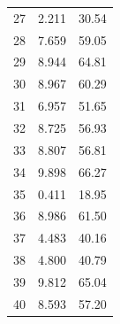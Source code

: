 \documentclass[10.5pt,notitlepage]{article}
\theoremstyle{plain}
\begin{document}
\begin{table}[htbp]
\begin{tabular}{@{}lr@{\hskip 0.4in}r@{}}
            27 & 2.211 & 30.54 \\
            28 & 7.659 & 59.05 \\
            29 & 8.944 & 64.81 \\
            30 & 8.967 & 60.29 \\
            31 & 6.957 & 51.65 \\
            32 & 8.725 & 56.93 \\
            33 & 8.807 & 56.81 \\
            34 & 9.898 & 66.27 \\
            35 & 0.411 & 18.95 \\
            36 & 8.986 & 61.50 \\
            37 & 4.483 & 40.16 \\
            38 & 4.800 & 40.79 \\
            39 & 9.812 & 65.04 \\
            40 & 8.593 & 57.20 \\
            \bottomrule
        \end{tabular}
        \label{tab 2}
    \end{table}
\end{document}
